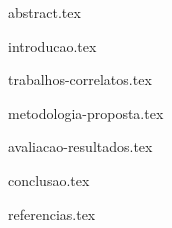 \documentclass[10pt,conference]{IEEEtran}
\begin{document}
  \maketitle

  {abstract.tex}

  \IEEEpeerreviewmaketitle

  {introducao.tex}

  {trabalhos-correlatos.tex}

  {metodologia-proposta.tex}

  {avaliacao-resultados.tex}

  {conclusao.tex}

  {referencias.tex}
\end{document}
